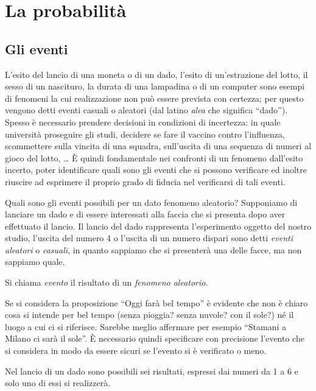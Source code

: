 \chapter{La probabilità}
\section{Gli eventi}
L'esito del lancio di una moneta o di un dado, l'esito di un'estrazione del lotto, il sesso di un nascituro, la durata di una lampadina o di un computer sono esempi di fenomeni la cui realizzazione non può essere prevista con certezza; per questo vengono detti eventi casuali o aleatori (dal latino \emph{alea} che significa ``dado''). Spesso è necessario prendere decisioni in condizioni di incertezza: in quale università proseguire gli studi, decidere se fare il vaccino contro l'influenza, scommettere sulla vincita di una squadra, sull'uscita di una sequenza di numeri al gioco del lotto, \ldots{} \`E quindi fondamentale nei confronti di un fenomeno dall'esito incerto, poter identificare quali sono gli eventi che si possono verificare ed inoltre riuscire ad esprimere il proprio grado di fiducia nel verificarsi di tali eventi.

Quali sono gli eventi possibili per un dato fenomeno aleatorio? Supponiamo di lanciare un dado e di essere interessati alla faccia che si presenta dopo aver effettuato il lancio. Il lancio del dado rappresenta l'esperimento oggetto del nostro studio, l'uscita del numero 4 o l'uscita di un numero dispari sono detti \emph{eventi aleatori} o \emph{casuali}, in quanto sappiamo che si presenterà una delle facce, ma non sappiamo quale.

\begin{definizione}
Si chiama \emph{evento} il risultato di un \emph{fenomeno aleatorio}.
\end{definizione}

Se si considera la proposizione ``Oggi farà bel tempo'' è evidente che non è chiaro cosa si intende per bel tempo (senza pioggia? senza nuvole? con il sole?) né il luogo a cui ci si riferisce. Sarebbe meglio affermare per esempio ``Stamani a Milano ci sarà il sole''. \`E necessario quindi specificare con precisione l'evento che si considera in modo da essere sicuri se l'evento si è verificato o meno.

Nel lancio di un dado sono possibili sei risultati, espressi dai numeri da 1 a 6 e solo uno di essi si realizzerà.

